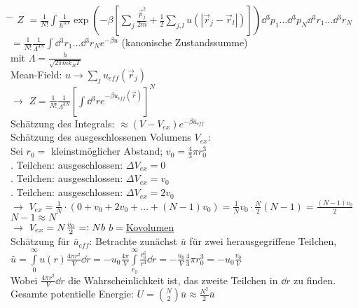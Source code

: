\begin{tabbing}
\hspace{4em} \= \hspace{4em} \= \kill
$Z$\> $= \frac{1}{N!}\int \frac{1}{h^{3N}}\exp \left(-\beta\left[\sum_j \frac{\vec{p}^2_j}{2 m} + \frac{1}{2} \sum_{j,l}u\left(\left|\vec{r}_j - \vec{r}_l\right|\right)\right]\right)\dd{}^3 p_1\dots \dd{}^3 p_N \dd{}^3 r_1\dots \dd{}^3 r_N$\\
\> $= \frac{1}{N!}\frac{1}{\Lambda^{3N}}\int\dd{}^3r_1\dots\dd{}^3r_N e^{-\beta u}$ (kanonische Zustandssumme)\\
mit $\Lambda = \frac{h}{\sqrt{2\pi m k_B T}}$\\
Mean-Field: $u \rightarrow \sum\limits_j u_{eff}\left(\vec{r}_j\right)$\\
$\rightarrow$\> $Z = \frac{1}{N!}\frac{1}{\Lambda^{3N}}\left[\int \dd{}^3r e^{-\beta u_{eff}\left(\vec{r}\right)}\right]^N$\\
Schätzung des Integrals: $\approx (V - V_{ex})e^{-\beta \bar{u}_{eff}}$\\
Schätzung des ausgeschlossenen Volumens $V_{ex}$:\\
\> Sei $r_0 = $ kleinstmöglicher Abstand; $v_0 = \frac{4}{3}\pi r_0^3$\\
. Teilchen: ausgeschlossen: $\Delta V_{ex} = 0$\\
. Teilchen: ausgeschlossen: $\Delta V_{ex} = v_0$\\
. Teilchen: ausgeschlossen: $\Delta V_{ex} = 2 v_0$\\
$\rightarrow$\> $V_{ex} = \frac{1}{N} \cdot \left(0+v_0 + 2 v_0 + \dots + (N-1) v_0\right) = \frac{1}{N}v_0 \cdot \frac{N}{2} (N - 1) = \frac{(N-1) v_0}{2}$\\
$N-1 \approx N$\\
$\rightarrow$\> $V_{ex} = N \frac{v_0}{2} = \vcentcolon N b$ $b =$\glqq\underline{Kovolumen}\grqq\\
Schätzung für $\bar{u}_{eff}$: Betrachte zunächst $\bar{u}$ für zwei herausgegriffene Teilchen,\\
\> $\bar{u} = \int\limits_{0}^{\infty} u(r) \frac{4\pi r^2}{V} \dd{r} = - u_0\frac{4\pi}{V} \int\limits_{r_0}^{\infty} \frac{r_0^6}{r^4}\dd{r} = -\frac{u_0}{V}\frac{4}{3}\pi r_0^3 = - u_0 \frac{v_0}{V}$\\
\> Wobei $\frac{4\pi r^2}{V} \dd{r}$ die Wahrscheinlichkeit ist, das zweite Teilchen in $\dd{r}$ zu finden.\\
\> Gesamte potentielle Energie: $U ={N \choose 2} \bar{u} \approx \frac{N^2}{2} \bar{u}$\\

\end{tabbing}
